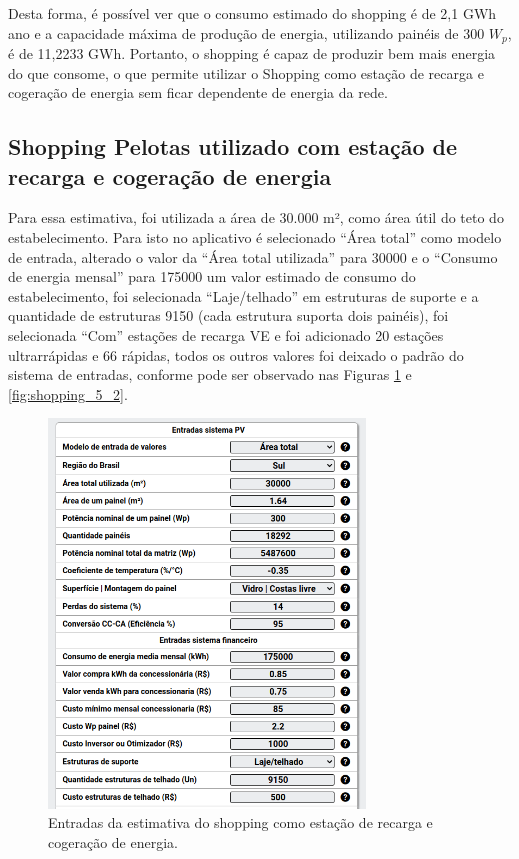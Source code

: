 Desta forma, é possível ver que o consumo estimado do shopping é de 2,1 GWh ano e a capacidade máxima de produção de energia, utilizando painéis de 300 $W_{p}$, é de 11,2233 GWh. Portanto, o shopping é capaz de produzir bem mais energia do que consome, o que permite utilizar o Shopping como estação de recarga e cogeração de energia sem ficar dependente de energia da rede.

\newpage
\subsection{Shopping Pelotas utilizado com estação de recarga e cogeração de energia}

Para essa estimativa, foi utilizada a área de 30.000 m², como área útil do teto do estabelecimento. Para isto no aplicativo é selecionado ``Área total'' como modelo de entrada, alterado o valor da ``Área total utilizada'' para 30000 e o ``Consumo de energia mensal'' para 175000 um valor estimado de consumo do estabelecimento, foi selecionada ``Laje/telhado'' em estruturas de suporte e a quantidade de estruturas 9150 (cada estrutura suporta dois painéis), foi selecionada ``Com'' estações de recarga VE e foi adicionado 20 estações ultrarrápidas e 66 rápidas, todos os outros valores foi deixado o padrão do sistema de entradas, conforme pode ser observado nas Figuras \ref{fig:shopping_5_1} e \ref{fig:shopping_5_2}.

\begin{figure}[H]
    \centering
    \includegraphics[width=0.75\textwidth]{./Figuras/shopping_5_1.png}
    \caption{Entradas da estimativa do shopping como estação de recarga e cogeração de energia.}
   \label{fig:shopping_5_1}
\end{figure}

